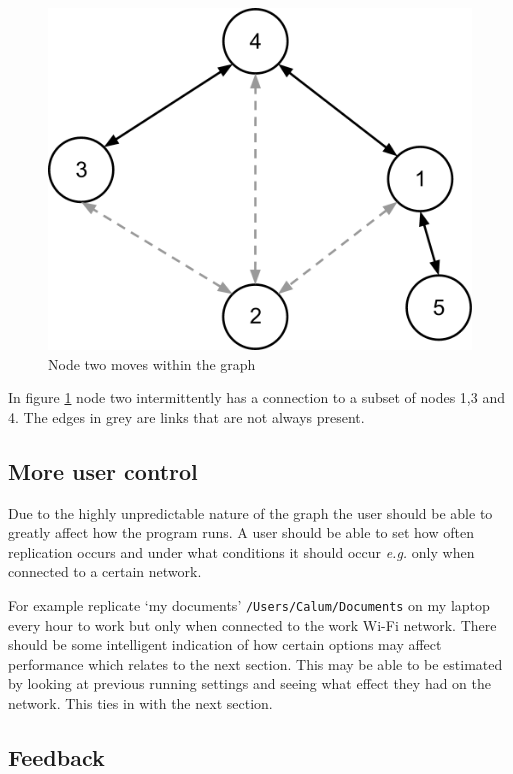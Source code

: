 \documentclass[12pt]{article}
\begin{document}
\begin{figure}[htp]
    \centering
    \includegraphics[scale=0.5]{images/mobile-node.png}
    \caption{Node two moves within the graph}
    \label{fig:mobile_node}
\end{figure}

In figure \ref{fig:mobile_node} node two intermittently has a 
connection to a subset of
nodes 1,3 and 4. The edges in grey are links that
are not always present.

\newpage
\subsection{More user control}

Due to the highly unpredictable nature of the graph the user
should be able to greatly affect how the program runs.
A user should be able to set how often replication occurs and
under what conditions it should occur \emph{e.g.} only when
connected to a certain network.

For example replicate
‘my documents’ \texttt{/Users/Calum/Documents} on my laptop every hour to
work but only when connected to the work Wi-Fi network.
There should be some intelligent indication of how certain options
may affect performance which relates to the next section. This
may be able to be estimated by looking at previous running settings
and seeing what effect they had on the network. This ties in with the
next section.

\subsection{Feedback}
\end{document}
